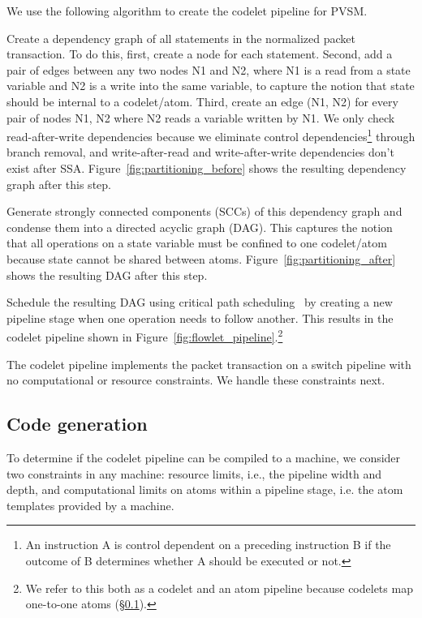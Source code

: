 We use the following algorithm to create the codelet pipeline for PVSM.
\begin{CompactEnumerate}
  \item Create a dependency graph of all statements in the normalized packet
    transaction. To do this, first, create a node for each statement. Second,
    add a pair of edges between any two nodes N1 and N2, where N1 is a read
    from a state variable and N2 is a write into the same variable, to capture
    the notion that state should be internal to a codelet/atom. Third, create
    an edge (N1, N2) for every pair of nodes N1, N2 where N2 reads a variable
    written by N1.  We only check read-after-write dependencies because we
    eliminate control dependencies\footnote{An instruction A is control
    dependent on a preceding instruction B if the outcome of B determines
    whether A should be executed or not.} through branch removal, and
    write-after-read and write-after-write dependencies don't exist after SSA.
    Figure~\ref{fig:partitioning_before} shows the resulting dependency graph
    after this step.
  \item Generate strongly connected components (SCCs) of this dependency graph
    and condense them into a directed acyclic graph (DAG). This captures the notion that all
    operations on a state variable must be confined to one codelet/atom because
    state cannot be shared between atoms. Figure~\ref{fig:partitioning_after}
    shows the resulting DAG after this step.
  \item Schedule the resulting DAG using critical path
    scheduling~\cite{crit_path_sched} by creating a new pipeline stage when one
    operation needs to follow another. This results in the codelet pipeline
    shown in Figure~\ref{fig:flowlet_pipeline}.\footnote{We refer to this both
    as a codelet and an atom pipeline because codelets map one-to-one atoms
  (\S\ref{ss:code_gen}).}
\end{CompactEnumerate}

The codelet pipeline implements the packet transaction on a switch pipeline
with no computational or resource constraints. We handle these constraints
next.

\subsection{Code generation}
\label{ss:code_gen}

To determine if the codelet pipeline can be compiled to a \absmachine machine,
we consider two constraints in any \absmachine machine: resource limits, i.e.,
the pipeline width and depth, and computational limits on atoms within a
pipeline stage, i.e. the atom templates provided by a \absmachine machine.

